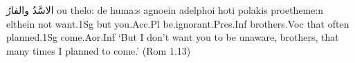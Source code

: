 \documentclass[a4paper]{article}
\begin{document}
\setmainlanguage{english}

\begin{example}
   \xglll %
   \textarabic{الاسَّدُ والفارُ}\xgle
 ou thelo: de huma:s agnoein adelphoi hoti polakis proetheme:n elthein \xgle 
 not want.1Sg but you.Acc.Pl be.ignorant.Pres.Inf brothers.Voc that often planned.1Sg come.Aor.Inf \xgle
 \glt `But I don't want you to be unaware, brothers, that many times I   planned to come.' 
 \glend
 \hfill (Rom 1.13)
\end{example}
\end{document}
